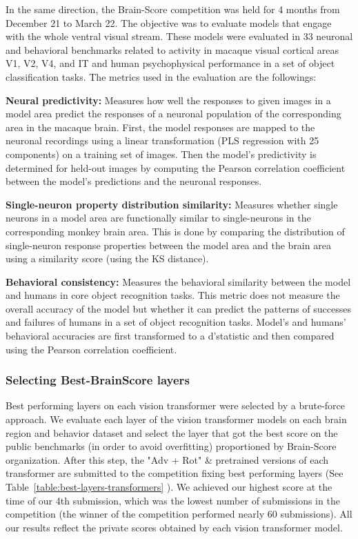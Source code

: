 \documentclass{article} %
\begin{document}
In the same direction, the Brain-Score competition was held for 4 months from December 21 to March 22. The objective was to evaluate models that engage with the whole ventral visual stream. These models were evaluated in 33 neuronal and behavioral benchmarks  related to activity in macaque visual cortical areas V1, V2, V4, and IT and human psychophysical performance in a set of object classification tasks. The metrics used in the evaluation are the followings:

\textbf{Neural predictivity:} Measures how well the responses to given images in a model area predict the responses of a neuronal population of the corresponding area in the macaque brain. First, the model responses are mapped to the neuronal recordings using a linear transformation (PLS regression with 25 components) on a training set of images. Then the model’s predictivity is determined for held-out images by computing the Pearson correlation coefficient between the model’s predictions and the neuronal responses. 

\textbf{Single-neuron property distribution similarity:} Measures whether single neurons in a model area are functionally similar to single-neurons in the corresponding monkey brain area. This is done by comparing the distribution of single-neuron response properties between the model area and the brain area using a similarity score (using the KS distance). 

\textbf{Behavioral consistency:} Measures the behavioral similarity between the model and humans in core object recognition tasks. This metric does not measure the overall accuracy of the model but whether it can predict the patterns of successes and failures of humans in a set of object recognition tasks. Model’s and humans’ behavioral accuracies are first transformed to a d’statistic and then compared using the Pearson correlation coefficient. 
\subsubsection{Selecting Best-BrainScore layers}

Best performing layers on each vision transformer were selected by a brute-force approach. We evaluate each layer of the vision transformer models on each brain region and behavior dataset and select the layer that got the best score on the public benchmarks (in order to avoid overfitting) proportioned by Brain-Score organization. After this step, the "Adv + Rot" \& pretrained versions of each transformer are submitted to the competition fixing best performing layers (See Table~\ref{table:best-layers-transformers} ). We achieved our highest score at the time of our 4th submission, which was the lowest number of submissions in the competition (the winner of the competition performed nearly 60 submissions). All our results reflect the private scores obtained by each vision transformer model.
\end{document}
